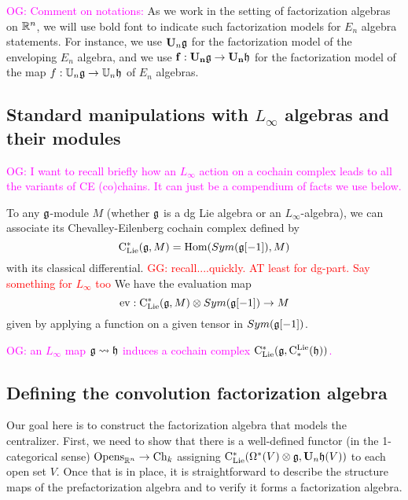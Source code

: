 \documentclass[11pt]{amsart}
\numberwithin{equation}{section}
\def\owen{\textcolor{magenta}{OG: }\textcolor{magenta}}
\def\greg{\textcolor{red}{GG: }\textcolor{red}}
\begin{document}
\owen{Comment on notations:}
As we work in the setting of factorization algebras on $\mathbb R^n$, 
we will use bold font to indicate such factorization models for $E_n$ algebra statements.
For instance, we use $\mathbf U_n \mathfrak g$ for the factorization model of the enveloping $E_n$ algebra,
and we use $\bf{f}: \mathbf U_n \mathfrak g \to \mathbf U_n \mathfrak h$ for the factorization model of the map $f: \mathbb U_n \mathfrak g \to \mathbb U_n \mathfrak h$ of $E_n$ algebras.

\subsection{Standard manipulations with $L_\infty$ algebras and their modules}

\owen{I want to recall briefly how an $L_\infty$ action on a cochain complex leads to all the variants of CE (co)chains.
It can just be a compendium of facts we use below.}

To any $\mathfrak g$-module $M$ (whether $\mathfrak g$ is a dg Lie algebra or an $L_\infty$-algebra), 
we can associate its Chevalley-Eilenberg cochain complex defined 
by 
\begin{equation}
 {\rm C}_{\rm Lie}^*(\mathfrak g, M) = {\rm Hom} (Sym(\mathfrak g[-1]), M)
\end{equation}
with its classical differential. 
\greg{recall....quickly. AT least for dg-part. Say something for $L_\infty$ too}
We have the evaluation map 
\begin{equation}
 \label{eq:defev} {\rm ev}: {\rm C}_{\rm Lie}^*(\mathfrak g, M) \otimes Sym(\mathfrak g[-1])\to M
\end{equation}
given by applying a function on a given tensor in $Sym(\mathfrak g[-1])$.

\begin{dfn}
\label{dfn: CE from map}
\owen{an $L_\infty$ map $\mathfrak g \rightsquigarrow \mathfrak h$ induces a cochain complex ${\rm C}_{\rm Lie}^*(\mathfrak g,{\rm C}^{\rm Lie}_*(\mathfrak h))$.}
\end{dfn}


\subsection{Defining the convolution factorization algebra}

Our goal here is to construct the factorization algebra that models the centralizer.
First, we need to show that there is a well-defined functor (in the 1-categorical sense) ${\rm Opens}_{\mathbb R^n} \to {\rm Ch}_k$ assigning ${\rm C}_{\rm Lie}^*(\Omega^*(V) \otimes \mathfrak g, \mathbf U_n \mathfrak h(V))$ to each open set $V$.
Once that is in place, it is straightforward to describe the structure maps of the prefactorization algebra and to verify it forms a factorization algebra.
\end{document}
